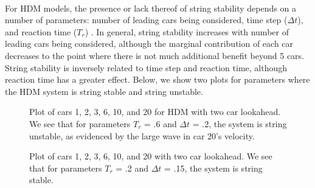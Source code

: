\documentclass[12pt]{article}
\begin{document}
\paragraph{}For HDM models, the presence or lack thereof of string stability depends on a number of parameters: number of leading cars being considered, time step ($\Delta t$), and reaction time ($T_r$) \cite[Chapter~15]{treiber_kesting_2013}. In general, string stability increases with number of leading cars being considered, although the marginal contribution of each car decreases to the point where there is not much additional benefit beyond 5 cars. String stability is inversely related to time step and reaction time, although reaction time has a greater effect. Below, we show two plots for parameters where the HDM system is string stable and string unstable.

\begin{figure}[H]
  \centering
  \caption{Plot of cars 1, 2, 3, 6, 10, and 20 for HDM with two car lookahead. We see that for parameters $T_r$ = .6 and $\Delta t$ = .2, the system is string unstable, as evidenced by the large wave in car 20's velocity.}
\end{figure}

\begin{figure}[H]
  \centering
  \caption{Plot of cars 1, 2, 3, 6, 10, and 20 with two car lookahead. We see that for parameters $T_r$ = .2 and $\Delta t$ = .15, the system is string stable.}
\end{figure}
\end{document}
